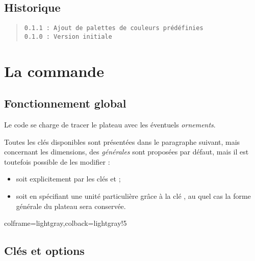 \documentclass[11pt,a4paper]{ltxdoc}
\begin{document}
\vfill

\subsection{Historique}

\begin{quote}
\begin{verbatim}
0.1.1 : Ajout de palettes de couleurs prédéfinies
0.1.0 : Version initiale
\end{verbatim}
\end{quote}

\pagebreak

\section{La commande}

\subsection{Fonctionnement global}

Le code se charge de tracer le plateau avec les éventuels \textit{ornements}.

Toutes les clés disponibles sont présentées dans le paragraphe suivant, mais concernant les dimensions, des \textit{générales} sont proposées par défaut, mais il est toutefois possible de les modifier :

\begin{itemize}
	\item soit explicitement par les clés \MontreCode{[Rayon=]} et \MontreCode{[HauteurCases=]} ;
	\item soit en spécifiant une unité particulière grâce à la clé \MontreCode{[Unite=]}, au quel cas la forme générale du plateau sera conservée.
\end{itemize}

\begin{tcblisting}{colframe=lightgray,colback=lightgray!5}
\PlateauTrivialPursuit[Unite=0.5]
%
\PlateauTrivialPursuit[Rayon=4,HauteurCases=1.25] %

\PlateauTrivialPursuit[Unite=0.33] %
\end{tcblisting}

\pagebreak

\subsection{Clés et options}
\end{document}
